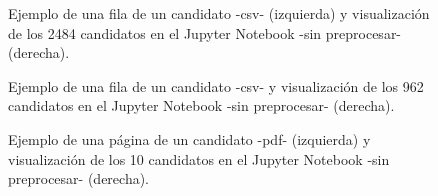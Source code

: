 \documentclass[12pt,a4paper]{article}
\begin{document}
\begin{sloppypar}
\begin{figure}[H] 
 \centering
 \noindent{}
 \caption{Ejemplo de una fila de un candidato -csv- (izquierda) y visualización de los 2484 candidatos en el Jupyter Notebook -sin preprocesar- (derecha).} 
 \label{fig:DS_Cand_2}
\end{figure}

\begin{figure}[H] 
 \centering
 \noindent{}
 \caption{Ejemplo de una fila de un candidato -csv- y visualización de los 962 candidatos en el Jupyter Notebook -sin preprocesar- (derecha).} 
 \label{fig:DS_Cand_3}
\end{figure}

\begin{figure}[H] 
 \centering
 \noindent{}
 \caption{Ejemplo de una página de un candidato -pdf- (izquierda) y visualización de los 10 candidatos en el Jupyter Notebook -sin preprocesar- (derecha).} 
 \label{fig:DS_Cand_4}
\end{figure}


\end{sloppypar}
\end{document}

